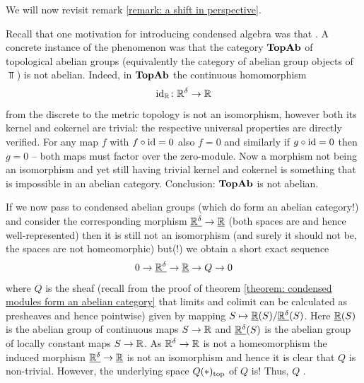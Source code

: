 We will now revisit remark \ref{remark: a shift in perspective}.
\begin{remark}
	\label{remark: the relief}
	
	Recall that one motivation for introducing condensed algebra was that . A concrete instance of the phenomenon was that the category ${{\mathbf{TopAb}}}$ of topological abelian groups (equivalently the category of abelian group objects of $\Top$) is not abelian. Indeed, in ${{\mathbf{TopAb}}}$ the continuous homomorphism
		$$\mathrm{id}_{\mathbb{R}}\colon {\mathbb{R}}^\delta \to {\mathbb{R}}$$
	from the discrete to the metric topology is not an isomorphism, however both its kernel and cokernel are trivial: the respective universal properties are directly verified. For any map $f$ with $f\circ \mathrm{id} = 0$ also $f=0$ and similarly if $g\circ \mathrm{id} = 0$ then $g=0$ -- both maps must factor over the zero-module. Now a morphism not being an isomorphism and yet still having trivial kernel and cokernel is something that is impossible in an abelian category. Conclusion: ${{\mathbf{TopAb}}}$ is not abelian.
	
	If we now pass to condensed abelian groups (which do form an abelian category!) and consider the corresponding morphism $\underline{{\mathbb{R}}^\delta} \to \underline{{\mathbb{R}}}$ (both spaces are \CGWH and hence well-represented) then it is still not an isomorphism (and surely it should not be, the spaces are not homeomorphic) but(!) we obtain a short exact sequence
		$$0\to \underline{{\mathbb{R}}^\delta}\to \underline{{\mathbb{R}}} \to Q \to 0$$
	where $Q$ is the sheaf (recall from the proof of theorem \ref{theorem: condensed modules form an abelian category} that limits and colimit can be calculated as presheaves and hence pointwise) given by mapping $S\mapsto \underline{{\mathbb{R}}}(S)/\underline{{\mathbb{R}}^\delta}(S)$. Here $\underline{{\mathbb{R}}}(S)$ is the abelian group of continuous maps $S\to {\mathbb{R}}$ and $\underline{{\mathbb{R}}^\delta}(S)$ is the abelian group of locally constant maps $S\to {\mathbb{R}}$. As ${\mathbb{R}}^\delta\to {\mathbb{R}}$ is not a homeomorphism the induced morphism $\underline{{\mathbb{R}}^\delta} \to \underline{{\mathbb{R}}}$ is not an isomorphism and hence it is clear that $Q$ is non-trivial. However, the underlying space ${Q(\ast)_\mathrm{top}}$ of $Q$ is! Thus, $Q$ .
	
%		
\end{remark}
